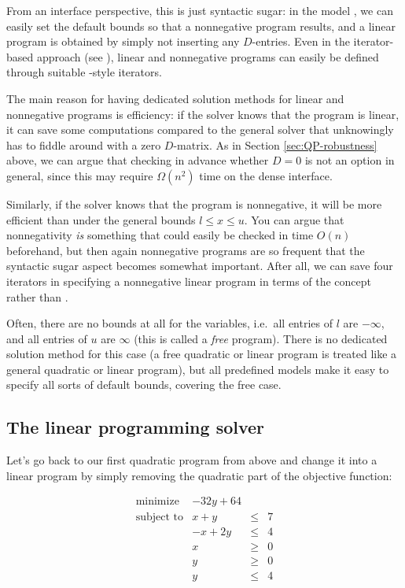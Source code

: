 From an interface perspective, this is just syntactic sugar: in the 
model , we can easily set the default bounds 
so that a nonnegative program results, and a linear program is
obtained by simply not inserting any $D$-entries. Even in the
iterator-based approach (see 
), linear
and nonnegative programs can easily be defined through suitable 
-style iterators.

The main reason for having dedicated solution methods for linear and
nonnegative programs is efficiency: if the solver knows that the program
is linear, it can save some computations compared to the general solver
that unknowingly has to fiddle around with a zero $D$-matrix. As in
Section \ref{sec:QP-robustness} above, we can argue that checking in
advance whether $D=0$ is not an option in general, since this may require 
$\Omega(n^2)$ time on the dense interface.

Similarly, if the solver knows that the program is nonnegative, it
will be more efficient than under the general bounds $l\leq x \leq u$.
You can argue that nonnegativity \emph{is} something that could easily
be checked in time $O(n)$ beforehand, but then again nonnegative
programs are so frequent that the syntactic sugar aspect becomes
somewhat important. After all, we can save four iterators in 
specifying a nonnegative linear program in terms of the concept 
 rather than 
.

Often, there are no bounds at all for the variables, i.e.\ all entries
of $l$ are $-\infty$, and all entries of $u$ are $\infty$ (this is
called a \emph{free} program). There is no dedicated solution method
for this case (a free quadratic or linear program is treated like a
general quadratic or linear program), but all predefined models make
it easy to specify all sorts of default bounds, covering the free 
case.

\subsection{The linear programming solver}
Let's go back to our first quadratic program from above and change it 
into a linear program by simply removing the quadratic part of the
objective function:

\[
\begin{array}{lrcl}
\mbox{minimize}       & - 32y + 64 \\
\mbox{subject to}     & x + y &\leq& 7 \\
                      & -x + 2y &\leq& 4 \\
                      & x &\geq& 0 \\
                      & y &\geq& 0 \\
                      & y &\leq& 4
\end{array}
\] 

